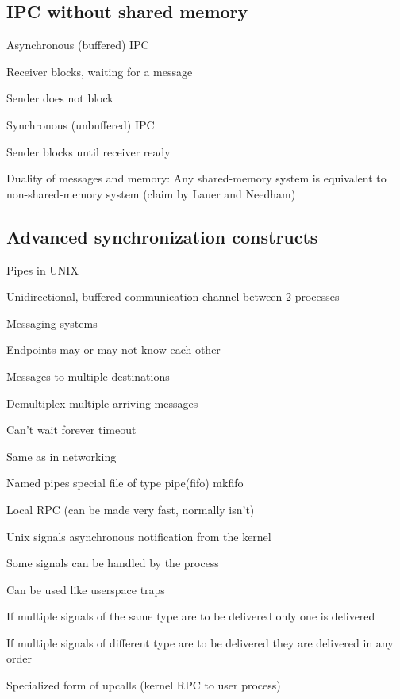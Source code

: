 \subsection{IPC without shared memory}
\enumstart
	\item Asynchronous (buffered) IPC
	\enumstart
		\item Receiver blocks, waiting for a message
		\item Sender does not block
	\enumend
	\item Synchronous (unbuffered) IPC
	\enumstart
		\item Sender blocks until receiver ready
	\enumend
	\item Duality of messages and memory: Any shared-memory system is equivalent to non-shared-memory system (claim by Lauer and Needham)
\enumend

\subsection{Advanced synchronization constructs}
\enumstart
	\item Pipes in UNIX
	\enumstart
		\item Unidirectional, buffered communication channel between 2 processes
	\enumend
	\item Messaging systems
	\enumstart
		\item Endpoints may or may not know each other
		\item Messages to multiple destinations
		\item Demultiplex multiple arriving messages
		\item Can't wait forever \arrow timeout
		\item Same as in networking
	\enumend
	\item Named pipes \arrow special file of type pipe(fifo) \arrow mkfifo
	\item Local RPC (can be made very fast, normally isn't)
	\item Unix signals \arrow asynchronous notification from the kernel
	\enumstart
		\item Some signals can be handled by the process
		\item Can be used like userspace traps
		\item If multiple signals of the same type are to be delivered \arrow only one is delivered
		\item If multiple signals of different type are to be delivered \arrow they are delivered in any order
		\item Specialized form of upcalls (kernel RPC to user process)
	\enumend
\enumend
